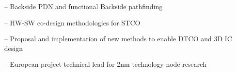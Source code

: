 \documentclass[10pt,a4paper,fancychapters]{altacv}
\begin{document}

\begin{itemize}
    \setlength{\itemindent}{0.5em}
    \item[--] \small{Backside PDN and functional Backside pathfinding}
    \item[--] \small{HW-SW co-design methodologies for STCO}
\end{itemize}



\begin{itemize}
    \setlength{\itemindent}{0.5em}
    \item[--] \small{Proposal and implementation of new methods to enable DTCO and 3D IC design}
    \item[--] \small{European project technical lead for 2nm technology node research}
\end{itemize}
\end{document}
